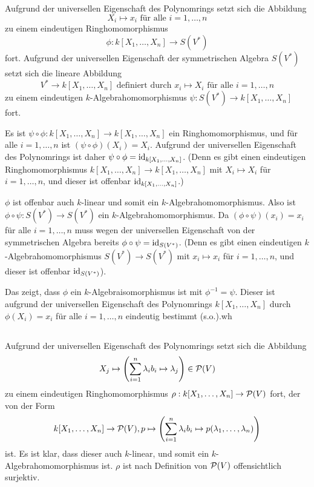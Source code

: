 \documentclass[a4paper,10pt]{article}
\begin{document}
\subsection{}
Aufgrund der universellen Eigenschaft des Polynomrings setzt sich die Abbildung
\[
 X_i \mapsto x_i \text{ für alle } i=1,\ldots,n
\]
zu einem eindeutigen Ringhomomorphismus
\[
 \phi : k[X_1, \ldots, X_n] \to S(V^*)
\]
fort. Aufgrund der universellen Eigenschaft der symmetrischen Algebra $S(V^*)$ setzt sich die lineare Abbildung
\[
 V^* \to k[X_1, \ldots, X_n] \text{ definiert durch } x_i \mapsto X_i \text{ für alle } i=1,\ldots,n
\]
zu einem eindeutigen $k$-Algebrahomomorphismus $\psi : S(V^*) \to k[X_1, \ldots, X_n]$ fort.

Es ist $\psi \circ \phi : k[X_1, \ldots, X_n] \to k[X_1, \ldots, X_n]$ ein Ringhomomorphismus, und für alle $i=1,\ldots,n$ ist $(\psi \circ \phi)(X_i) = X_i$. Aufgrund der universellen Eigenschaft des Polynomrings ist daher $\psi \circ \phi = \operatorname{id}_{k[X_1, \ldots, X_n]}$. (Denn es gibt einen eindeutigen Ringhomomorphismus $k[X_1, \ldots, X_n] \to k[X_1, \ldots, X_n]$ mit $X_i \mapsto X_i$ für $i=1,\ldots,n$, und dieser ist offenbar $\operatorname{id}_{k[X_1, \ldots, X_n]}$.)

$\phi$ ist offenbar auch $k$-linear und somit ein $k$-Algebrahomomorphismus. Also ist $\phi \circ \psi : S(V^*) \to S(V^*)$ ein $k$-Algebrahomomorphismus. Da $(\phi \circ \psi)(x_i) = x_i$ für alle $i=1,\ldots,n$ muss wegen der universellen Eigenschaft von der symmetrischen Algebra bereits $\phi \circ \psi = \operatorname{id}_{S(V^*)}$. (Denn es gibt einen eindeutigen $k$-Algebraho\-mo\-mor\-phis\-mus $S(V^*) \to S(V^*)$  mit $x_i \mapsto x_i$ für $i=1,\ldots,n$, und dieser ist offenbar $\operatorname{id}_{S(V^*)}$).

Das zeigt, dass $\phi$ ein $k$-Algebraisomorphismus ist mit $\phi^{-1} = \psi$. Dieser ist aufgrund der universellen Eigenschaft des Polynomrings $k[X_1, \ldots, X_n]$ durch $\phi(X_i) = x_i$ für alle $i=1,\ldots,n$ eindeutig bestimmt (s.o.).wh


\subsection{}
Aufgrund der universellen Eigenschaft des Polynomrings setzt sich die Abbildung
\[
 X_j \mapsto \left(\sum_{i=1}^n \lambda_i b_i \mapsto \lambda_j\right) \in \mathcal{P}(V)
\]
zu einem eindeutigen Ringhomomorphismus $\rho : k[X_1, \ldots, X_n] \to \mathcal{P}(V)$ fort, der von der Form
\[
 k[X_1, \ldots, X_n] \to \mathcal{P}(V),
 p \mapsto \left( \sum_{i=1}^n \lambda_i b_i \mapsto p(\lambda_1, \ldots, \lambda_n) \right)
\]
ist. Es ist klar, dass dieser auch $k$-linear, und somit ein $k$-Algebrahomomorphismus ist. $\rho$ ist nach Definition von $\mathcal{P}(V)$ offensichtlich surjektiv.
\end{document}
